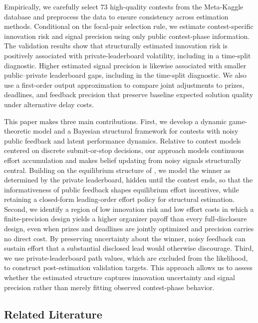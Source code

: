 \documentclass[mnsc]{informs3}
\begin{document}
Empirically, we carefully select 73 high-quality contests from the Meta-Kaggle database and preprocess the data to ensure consistency across estimation methods.
Conditional on the focal-pair selection rule, we estimate contest-specific innovation risk and signal precision using only public contest-phase information.
The validation results show that structurally estimated innovation risk is positively associated with private-leaderboard volatility, including in a time-split diagnostic.
Higher estimated signal precision is likewise associated with smaller public--private leaderboard gaps, including in the time-split diagnostic.
We also use a first-order output approximation to compare joint adjustments to prizes, deadlines, and feedback precision that preserve baseline expected solution quality under alternative delay costs.


This paper makes three main contributions.
First, we develop a dynamic game-theoretic model and a Bayesian structural framework for contests with noisy public feedback and latent performance dynamics.
Relative to contest models centered on discrete submit-or-stop decisions, our approach models continuous effort accumulation and makes belief updating from noisy signals structurally central.
Building on the equilibrium structure of \citet{Ryvkin2022Fight}, we model the winner as determined by the private leaderboard, hidden until the contest ends, so that the informativeness of public feedback shapes equilibrium effort incentives, while retaining a closed-form leading-order effort policy for structural estimation.
Second, we identify a region of low innovation risk and low effort costs in which a finite-precision design yields a higher organizer payoff than every full-disclosure design, even when prizes and deadlines are jointly optimized and precision carries no direct cost. By preserving uncertainty about the winner, noisy feedback can sustain effort that a substantial disclosed lead would otherwise discourage.
Third, we use private-leaderboard path values, which are excluded from the likelihood, to construct post-estimation validation targets.
This approach allows us to assess whether the estimated structure captures innovation uncertainty and signal precision rather than merely fitting observed contest-phase behavior.



\subsection{Related Literature}
\end{document}

